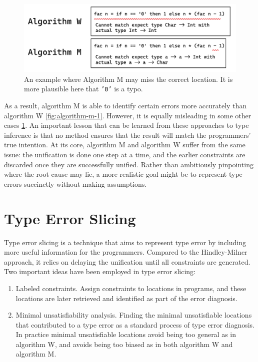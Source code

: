\begin{figure}[hbt]
  \includegraphics[width=0.8\linewidth]{AlgorithmWM2}
  \caption{
    \label{fig:algorithm-m-2}
    An example where Algorithm M may miss the correct location. It is more plausible here that \texttt{'0'} is a typo.}
\end{figure}


As a result, algorithm M is able to identify certain errors more accurately than algorithm W \ref{fig:algorithm-m-1}. However, it is equally misleading in some other cases \ref{fig:algorithm-m-2}. An important lesson that can be learned from these approaches to type inference is that no method ensures that the result will match the programmers' true intention. At its core, algorithm M and algorithm W suffer from the same issue: the unification is done one step at a time, and the earlier constraints are discarded once they are successfully unified. Rather than ambitiously pinpointing where the root cause may lie, a more realistic goal might be to represent type errors succinctly without making assumptions.



\section{Type Error Slicing}

Type error slicing \cite{Tip2001-qn, Haack2004-fr} is a technique that aims to represent type error by including more useful information for the programmers. Compared to the Hindley-Milner approach, it relies on delaying the unification until all constraints are generated. Two important ideas have been employed in type error slicing: 


\begin{enumerate}
  \item {
    Labeled constraints. Assign constraints to locations in programs, and these locations are later retrieved and identified as part of the error diagnosis. 
  }
  \item {
    Minimal unsatisfiability analysis. Finding the minimal unsatisfiable locations that contributed to a type error  as a standard process of type error diagnosis. In practice minimal unsatisfiable locations avoid being too general as in algorithm W, and avoids being too biased as in both algorithm W and algorithm M. 
  }
\end{enumerate}


